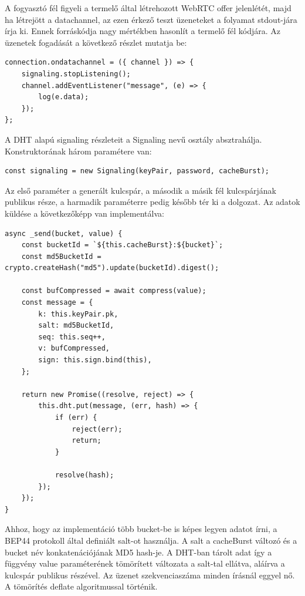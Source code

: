 A fogyasztó fél figyeli a termelő által létrehozott WebRTC offer jelenlétét, majd ha létrejött a datachannel, az ezen
érkező teszt üzeneteket a folyamat stdout-jára írja ki.
Ennek forráskódja nagy mértékben hasonlít a termelő fél kódjára.
Az üzenetek fogadását a következő részlet mutatja be:

\begin{lstlisting}[label={lst:lstlisting3}]
connection.ondatachannel = ({ channel }) => {
    signaling.stopListening();
    channel.addEventListener("message", (e) => {
        log(e.data);
    });
};
\end{lstlisting}

A DHT alapú signaling részleteit a Signaling nevű osztály absztrahálja.
Konstruktorának három paramétere van:

\begin{lstlisting}[label={lst:lstlisting5}]
const signaling = new Signaling(keyPair, password, cacheBurst);
\end{lstlisting}

Az első paraméter a generált kulcspár, a második a másik fél kulcspárjának publikus része, a harmadik paraméterre pedig
később tér ki a dolgozat.
Az adatok küldése a következőképp van implementálva:

\begin{lstlisting}[label={lst:lstlisting6}]
async _send(bucket, value) {
    const bucketId = `${this.cacheBurst}:${bucket}`;
    const md5BucketId = crypto.createHash("md5").update(bucketId).digest();

    const bufCompressed = await compress(value);
    const message = {
        k: this.keyPair.pk,
        salt: md5BucketId,
        seq: this.seq++,
        v: bufCompressed,
        sign: this.sign.bind(this),
    };

    return new Promise((resolve, reject) => {
        this.dht.put(message, (err, hash) => {
            if (err) {
                reject(err);
                return;
            }

            resolve(hash);
        });
    });
}
\end{lstlisting}

Ahhoz, hogy az implementáció több bucket-be is képes legyen adatot írni, a BEP44 protokoll által definiált salt-ot
használja.
A salt a cacheBurst változó és a bucket név konkatenációjának MD5 hash-je.
A DHT-ban tárolt adat így a függvény value paraméterének tömörített változata a salt-tal ellátva, aláírva a kulcspár publikus
részével.
Az üzenet szekvenciaszáma minden írásnál eggyel nő.
A tömörítés deflate algoritmussal történik.

